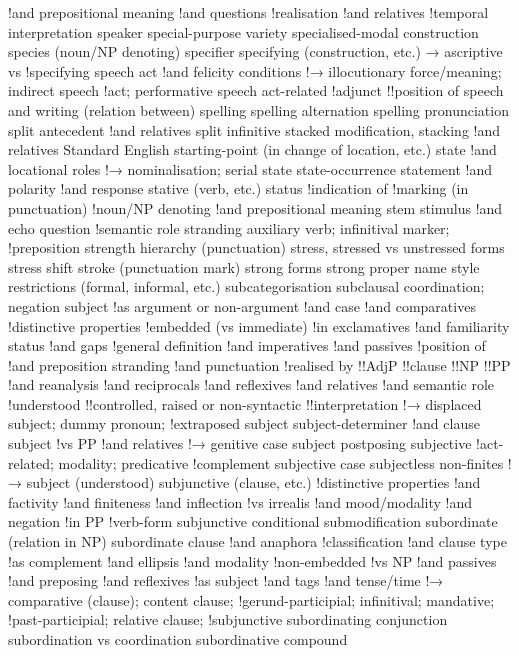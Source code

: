 !and prepositional meaning
!and questions
!realisation
!and relatives
!temporal interpretation
speaker
special-purpose variety
specialised-modal construction
species (noun/NP denoting)
specifier
specifying (construction, etc.) → ascriptive vs
!specifying
speech act
!and felicity conditions
!→ illocutionary force/meaning; indirect speech
!act; performative
speech act-related
!adjunct
!!position of
speech and writing (relation between)
spelling
spelling alternation
spelling pronunciation
split antecedent
!and relatives
split infinitive
stacked modification, stacking
!and relatives
Standard English
starting-point (in change of location, etc.)
state
!and locational roles
!→ nominalisation; serial state
state-occurrence
statement
!and polarity
!and response
stative (verb, etc.)
status
!indication of
!marking (in punctuation)
!noun/NP denoting
!and prepositional meaning
stem
stimulus
!and echo question
!semantic role
stranding auxiliary verb; infinitival marker;
!preposition
strength hierarchy (punctuation)
stress, stressed vs unstressed forms
stress shift
stroke (punctuation mark)
strong forms
strong proper name
style restrictions (formal, informal, etc.)
subcategorisation
subclausal coordination; negation
subject
!as argument or non-argument
!and case
!and comparatives
!distinctive properties
!embedded (vs immediate)
!in exclamatives
!and familiarity status
!and gaps
!general definition
!and imperatives
!and passives
!position of
!and preposition stranding
!and punctuation
!realised by
!!AdjP
!!clause
!!NP
!!PP
!and reanalysis
!and reciprocals
!and reflexives
!and relatives
!and semantic role
!understood
!!controlled, raised or non-syntactic
!!interpretation
!→ displaced subject; dummy pronoun;
!extraposed subject
subject-determiner
!and clause subject
!vs PP
!and relatives
!→ genitive case
subject postposing
subjective
!act-related; modality; predicative
!complement
subjective case
subjectless non-finites
!→ subject (understood)
subjunctive (clause, etc.)
!distinctive properties
!and factivity
!and finiteness
!and inflection
!vs irrealis
!and mood/modality
!and negation
!in PP
!verb-form
subjunctive conditional
submodification
subordinate (relation in NP)
subordinate clause
!and anaphora
!classification
!and clause type
!as complement
!and ellipsis
!and modality
!non-embedded
!vs NP
!and passives
!and preposing
!and reflexives
!as subject
!and tags
!and tense/time
!→ comparative (clause); content clause;
!gerund-participial; infinitival; mandative;
!past-participial; relative clause;
!subjunctive
subordinating conjunction
subordination vs coordination
subordinative compound
